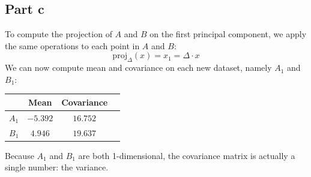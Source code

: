\documentclass[a4paper, 10pt]{article}
\begin{document}
\subsection{Part c}
To compute the projection of $A$ and $B$ on the first principal component, we apply the same operations to
each point in $A$ and $B$:
$$
\text{proj}_\Delta(x) = x_1 = \Delta \cdot x 
$$
We can now compute mean and covariance on each new dataset, namely $A_1$ and $B_1$:
\begin{center}
\begin{tabular}{ |c|c|c|c| }
    \hline
    \  & Mean & Covariance \\ 
    \hline
    $A_1$ & $-5.392$ & $16.752$ \\
    \hline
    $B_1$ & $4.946$ & $19.637$ \\
    \hline
\end{tabular}
\end{center}
Because $A_1$ and $B_1$ are both 1-dimensional, the covariance matrix is actually a single number: the variance.
\end{document}
